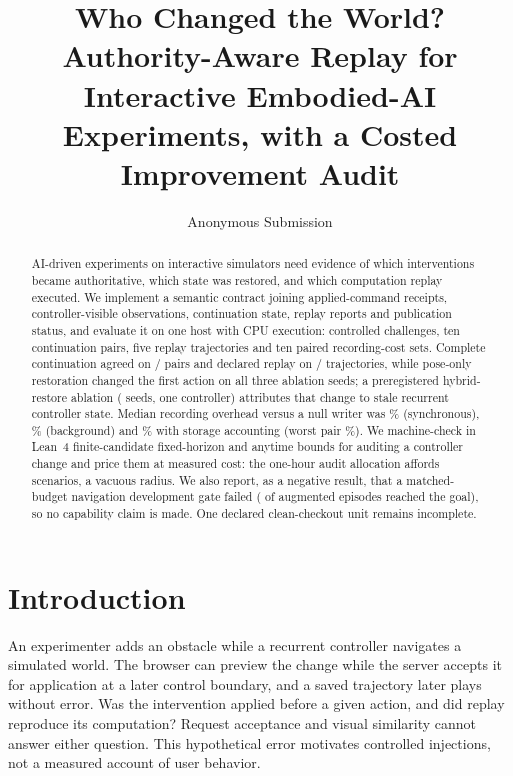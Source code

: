 \documentclass[letterpaper]{article}
\title{Who Changed the World? Authority-Aware Replay for Interactive Embodied-AI Experiments, with a Costed Improvement Audit}
\author{Anonymous Submission}
\begin{document}
\maketitle
\begin{abstract}
AI-driven experiments on interactive simulators need evidence of which interventions
became authoritative, which state was restored, and which computation replay executed.
We implement a semantic contract joining applied-command receipts, controller-visible
observations, continuation state, replay reports and publication status, and evaluate it
on one host with CPU execution: \FaultDeclaredUnits{} controlled challenges, ten continuation pairs, five replay
trajectories and ten paired recording-cost sets. Complete continuation agreed on
\ContinuationPassed{}/\ContinuationDeclared{} pairs and declared replay on
\ReplayPassed{}/\ReplayDeclared{} trajectories, while pose-only restoration changed the
first action on all three ablation seeds; a preregistered hybrid-restore ablation (\CompSeeds{} seeds, one controller)
attributes that change to stale recurrent controller state. Median recording overhead versus a null writer was
\SynchronousOverheadMedian{}\% (synchronous), \BackgroundOverheadMedian{}\% (background) and
\StorageOverheadMedian{}\% with storage accounting (worst pair \StorageOverheadMaximum{}\%).
We machine-check in Lean~4 finite-candidate fixed-horizon and anytime bounds for auditing a
controller change and price them at measured cost: the one-hour audit allocation affords
\AuditLaneScenarios{} scenarios, a vacuous radius. We also report, as a negative result, that a
matched-budget navigation development gate failed (\MaleVfourAugGoals{} of \MaleVfourEpisodes{} augmented episodes reached the goal),
so no capability claim is made. One declared clean-checkout unit remains incomplete.
\end{abstract}

\section{Introduction}
An experimenter adds an obstacle while a recurrent controller navigates a simulated world. The
browser can preview the change while the server accepts it for application at a later control
boundary, and a saved trajectory later plays without error. Was the intervention applied before
a given action, and did replay reproduce its computation? Request acceptance and visual similarity
cannot answer either question. This hypothetical error motivates controlled injections, not a
measured account of user behavior.
\end{document}
